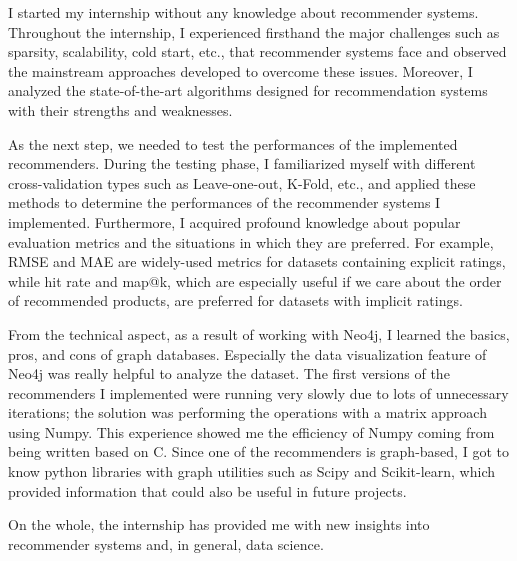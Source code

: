 I started my internship without any knowledge about recommender systems. Throughout the internship, I experienced firsthand the major challenges such as sparsity, scalability, cold start, etc., that recommender systems face and observed the mainstream approaches developed to overcome these issues. Moreover, I analyzed the state-of-the-art algorithms designed for recommendation systems with their strengths and weaknesses.

As the next step, we needed to test the performances of the implemented recommenders. During the testing phase, I familiarized myself with different cross-validation types such as Leave-one-out, K-Fold, etc., and applied these methods to determine the performances of the recommender systems I implemented. Furthermore, I acquired profound knowledge about popular evaluation metrics and the situations in which they are preferred. For example, RMSE and MAE are widely-used metrics for datasets containing explicit ratings, while hit rate and map@k, which are especially useful if we care about the order of recommended products, are preferred for datasets with implicit ratings. 

From the technical aspect, as a result of working with Neo4j, I learned the basics, pros, and cons of graph databases. Especially the data visualization feature of Neo4j was really helpful to analyze the dataset. The first versions of the recommenders I implemented were running very slowly due to lots of unnecessary iterations; the solution was performing the operations with a matrix approach using Numpy. This experience showed me the efficiency of Numpy coming from being written based on C. Since one of the recommenders is graph-based, I got to know python libraries with graph utilities such as Scipy and Scikit-learn, which provided information that could also be useful in future projects.

On the whole, the internship has provided me with new insights into recommender systems and, in general, data science. 
